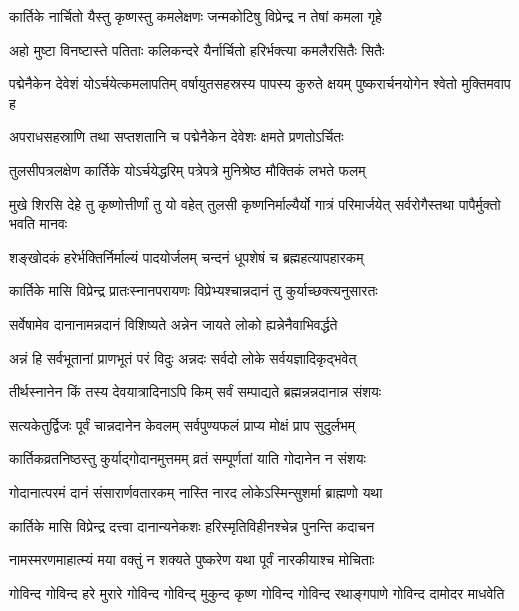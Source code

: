 \twolineshloka
{कार्तिके नार्चितो यैस्तु कृष्णस्तु कमलेक्षणः}
{जन्मकोटिषु विप्रेन्द्र न तेषां कमला गृहे} %

\twolineshloka
{अहो मुष्टा विनष्टास्ते पतिताः कलिकन्दरे}
{यैर्नार्चितो हरिर्भक्त्या कमलैरसितैः सितैः} %

\threelineshloka
{पद्मेनैकेन देवेशं योऽर्चयेत्कमलापतिम्}
{वर्षायुतसहस्रस्य पापस्य कुरुते क्षयम्}
{पुष्करार्चनयोगेन श्वेतो मुक्तिमवाप ह} %

\twolineshloka
{अपराधसहस्राणि तथा सप्तशतानि च}
{पद्मेनैकेन देवेशः क्षमते प्रणतोऽर्चितः} %

\twolineshloka
{तुलसीपत्रलक्षेण कार्तिके योऽर्चयेद्धरिम्}
{पत्रेपत्रे मुनिश्रेष्ठ मौक्तिकं लभते फलम्} %

\threelineshloka
{मुखे शिरसि देहे तु कृष्णोत्तीर्णां तु यो वहेत्}
{तुलसी कृष्णनिर्माल्यैर्यो गात्रं परिमार्जयेत्}
{सर्वरोगैस्तथा पापैर्मुक्तो भवति मानवः} %

\twolineshloka
{शङ्खोदकं हरेर्भक्तिर्निर्माल्यं पादयोर्जलम्}
{चन्दनं धूपशेषं च ब्रह्महत्यापहारकम्} %

\twolineshloka
{कार्तिके मासि विप्रेन्द्र प्रातःस्नानपरायणः}
{विप्रेभ्यश्चान्नदानं तु कुर्याच्छक्त्यनुसारतः} %

\twolineshloka
{सर्वेषामेव दानानामन्नदानं विशिष्यते}
{अन्नेन जायते लोको ह्यन्नेनैवाभिवर्द्धते} %

\twolineshloka
{अन्नं हि सर्वभूतानां प्राणभूतं परं विदुः}
{अन्नदः सर्वदो लोके सर्वयज्ञादिकृद्भवेत्} %

\twolineshloka
{तीर्थस्नानेन किं तस्य देवयात्रादिनाऽपि किम्}
{सर्वं सम्पाद्यते ब्रह्मन्नन्नदानान्न संशयः} %

\twolineshloka
{सत्यकेतुर्द्विजः पूर्वं चान्नदानेन केवलम्}
{सर्वपुण्यफलं प्राप्य मोक्षं प्राप सुदुर्लभम्} %

\twolineshloka
{कार्तिकव्रतनिष्ठस्तु कुर्याद्गोदानमुत्तमम्}
{व्रतं सम्पूर्णतां याति गोदानेन न संशयः} %

\twolineshloka
{गोदानात्परमं दानं संसारार्णवतारकम्}
{नास्ति नारद लोकेऽस्मिन्सुशर्मा ब्राह्मणो यथा} %

\twolineshloka
{कार्तिके मासि विप्रेन्द्र दत्त्वा दानान्यनेकशः}
{हरिस्मृतिविहीनश्चेन्न पुनन्ति कदाचन} %

\twolineshloka
{नामस्मरणमाहात्म्यं मया वक्तुं न शक्यते}
{पुष्करेण यथा पूर्वं नारकीयाश्च मोचिताः} %

\fourlineindentedshloka
{गोविन्द गोविन्द हरे मुरारे}
{गोविन्द गोविन्द् मुकुन्द कृष्ण}
{गोविन्द गोविन्द रथाङ्गपाणे}
{गोविन्द दामोदर माधवेति} %

